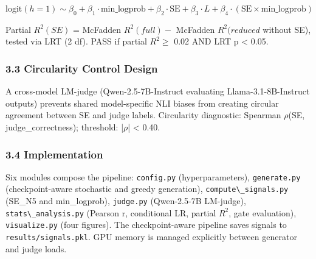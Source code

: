 $$\text{logit}(h=1) \sim \beta_0 + \beta_1 \cdot \text{min\_logprob} + \beta_2 \cdot \text{SE} + \beta_3 \cdot L + \beta_4 \cdot (\text{SE} \times \text{min\_logprob})$$

Partial $R^{2}(SE)$ = McFadden $R^{2}(full) -$ McFadden $R^{2}(reduced$ without SE), tested via LRT (2 df). PASS if partial $R^2 \geq$ 0.02 AND LRT p < 0.05.

\subsubsection{3.3 Circularity Control Design}

A cross-model LM-judge (Qwen-2.5-7B-Instruct evaluating Llama-3.1-8B-Instruct outputs) prevents shared model-specific NLI biases from creating circular agreement between SE and judge labels. Circularity diagnostic: Spearman $\rho$(SE, judge\_correctness); threshold: |$\rho$| < 0.40.

\subsubsection{3.4 Implementation}

Six modules compose the pipeline: \texttt{config.py} (hyperparameters), \texttt{generate.py} (checkpoint-aware stochastic and greedy generation), \texttt{compute\textbackslash \_signals.py} (SE\_N5 and min\_logprob), \texttt{judge.py} (Qwen-2.5-7B LM-judge), \texttt{stats\textbackslash \_analysis.py} (Pearson r, conditional LR, partial $R^2$, gate evaluation), \texttt{visualize.py} (four figures). The checkpoint-aware pipeline saves signals to \texttt{results/signals.pkl}. GPU memory is managed explicitly between generator and judge loads.

